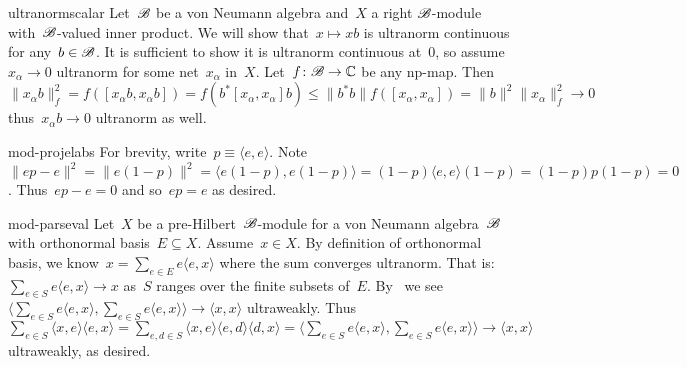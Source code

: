 \begin{solution}{ultranormscalar}%
    Let~$\mathscr{B}$ be a von Neumann algebra and~$X$
        a right $\mathscr{B}$-module with~$\mathscr{B}$-valued inner product.
    We will show that~$x \mapsto xb$ is ultranorm continuous
        for any~$b \in \mathscr{B}$.
    It is sufficient to show it is ultranorm continuous at~$0$,
        so assume~$x_\alpha \to 0$ ultranorm for some net~$x_\alpha$ in~$X$.
Let~$f\colon \mathscr{B} \to \mathbb{C}$ be any np-map.
    Then~$\|x_\alpha b\|_f^2  
        = f([x_\alpha b, x_\alpha b])
        = f(b^* [x_\alpha , x_\alpha ]b)
        \leq \|b^*b\| f([x_\alpha, x_\alpha])
        = \|b\|^2 \|x_\alpha \|_f^2 \to 0$
        thus~$x_\alpha b \to 0$ ultranorm as well.
\end{solution}
\begin{solution}{mod-projelabs}%
For brevity, write~$p \equiv \langle e,e\rangle$.
Note~$\| e p - e\|^2
    = \| e (1-p) \|^2
    = \langle e (1 - p), e (1-p) \rangle
    = (1-p) \langle e,e\rangle (1-p)
    = (1-p) p (1-p) = 0$.
Thus~$ep - e= 0$ and so~$ep = e$ as desired.
\end{solution}
\begin{solution}{mod-parseval}%
Let~$X$ be a pre-Hilbert~$\mathscr{B}$-module for a von Neumann algebra~$\mathscr{B}$
    with orthonormal basis~$E \subseteq X$.
Assume~$x \in X$.
By definition of orthonormal basis,
    we know~$x = \sum_{e \in E} e \langle e,x\rangle$
    where the sum converges ultranorm.
That is: $\sum_{e \in S} e \langle e,x\rangle \to x$
    as~$S$ ranges over the finite subsets of~$E$.
    By~
        we
        see~$
        \bigl\langle
        \sum_{e \in S} e \langle e,x\rangle,
        \sum_{e \in S} e \langle e,x\rangle \bigr\rangle
        \to \langle x, x\rangle $ ultraweakly.
Thus~$\sum_{e \in S} \langle x,e\rangle\langle e, x\rangle
    = \sum_{e,d \in S} \langle x,e\rangle\langle e,d\rangle\langle d, x\rangle
    =
        \bigl\langle
        \sum_{e \in S} e \langle e,x\rangle,
        \sum_{e \in S} e \langle e,x\rangle \bigr\rangle
        \to \langle x, x\rangle $ ultraweakly, as desired.
\end{solution}
